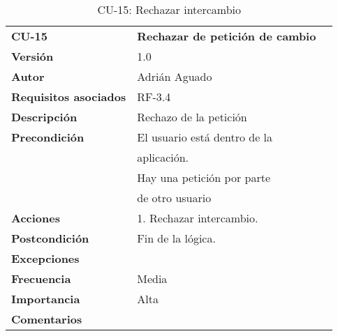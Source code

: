 \begin{table}[H]
\begin{tabular}{llr}  
\toprule
\begin{minipage}[b]{0.24\columnwidth}\raggedright\strut
\textbf{CU-15}\strut
\end{minipage} & \begin{minipage}[b]{0.72\columnwidth}\raggedright\strut
\textbf{Rechazar de petición de cambio}\strut
\end{minipage}\tabularnewline
\cmidrule(r){1-2}
\textbf{Versión}       & 1.0           \\
\textbf{Autor}       & Adrián  Aguado    \\
\textbf{Requisitos asociados}       & RF-3.4 \\
\textbf{Descripción} & Rechazo de la petición\\
\textbf{Precondición}  & El usuario está dentro de la \\
& aplicación.      \\
& Hay una petición por parte \\
& de otro usuario \\
\textbf{Acciones} & 1. Rechazar intercambio. \\
\textbf{Postcondición} & Fin de la lógica. \\
\textbf{Excepciones} &     \\
\textbf{Frecuencia} & Media          \\
\textbf{Importancia} & Alta            \\
\textbf{Comentarios } &  \\
\bottomrule
\end{tabular}
\caption{CU-15: Rechazar intercambio} 
\end{table}

